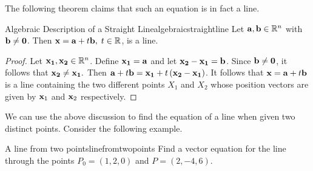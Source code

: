 The following theorem claims that such an equation is in fact a line. 

\begin{proposition}{Algebraic Description of a Straight Line}{algebraicstraightline}
Let ${\bf a},{\bf b}\in \mathbb{R}^{n}$ with ${\bf b}\neq {\bf 0}$. 
Then ${\bf x}={\bf a}+t{\bf b},\; t\in \mathbb{R}$, is a
line.
\end{proposition}

\begin{proof}
Let ${\bf x_{1}}, {\bf x_{2}} \in \mathbb{R}^n$. 
Define ${\bf x_{1}}={\bf a}$ and let ${\bf x_{2}}-{\bf x_{1}}={\bf b}$.
Since ${\bf b} \neq {\bf 0}$, it follows that ${\bf x_{2}}\neq {\bf x_{1}}.$ Then
${\bf a}+t{\bf b}={\bf x_{1}} + t\left( {\bf x_{2}}-{\bf x_{1}}\right) $. It follows that  
${\bf x}={\bf a}+t{\bf b}$ is a line containing the two different points 
$X_1$ and $X_2$ whose position vectors are given by ${\bf x}_1$ and ${\bf x}_2$ respectively. 
\end{proof}

We can use the above discussion to find the equation of a line when given two distinct points.
Consider the following example. 

\begin{example}{A line from two points}{linefromtwopoints}
Find a vector equation for the line through the points $P_0 = \left(
1,2,0\right) $ and $P = \left( 2,-4,6\right).$
\end{example}

